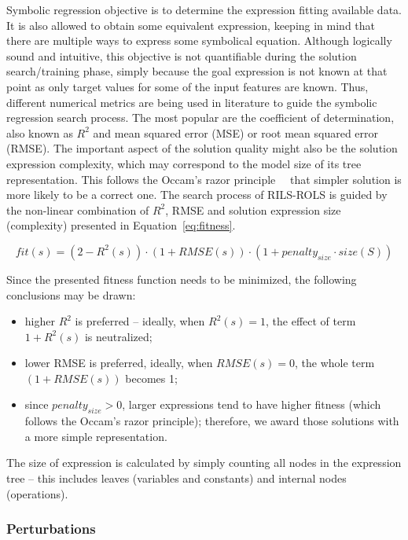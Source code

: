 \documentclass[a4paper,12pt]{elsarticle}
\begin{document}
Symbolic regression objective is to determine the expression fitting available data. It is also allowed to obtain some equivalent expression, keeping in mind that there are multiple ways to express some symbolical equation. Although logically sound and intuitive, this objective is not quantifiable during the solution search/training phase, simply because the goal expression is not known at that point as only target values for some of the input features are known. Thus, different numerical metrics are being used in literature to guide the symbolic regression search process. The most popular are the coefficient of determination, also known as $R^2$ and mean squared error (MSE) or root mean squared error (RMSE). The important aspect of the solution quality might also be the solution expression complexity, which may correspond to the model size of its tree representation. This follows the Occam's razor principle~\cite{costa2020fast}~ that simpler solution  is more likely to be a correct one. 
The search process of \textsc{RILS}-\textsc{ROLS}  is guided by the non-linear combination of $R^2$, RMSE and solution expression size (complexity) presented in Equation~\ref{eq:fitness}. 
 
\begin{equation}
	\label{eq:fitness}
	fit(s) = (2-R^2(s)) \cdot (1+RMSE(s)) \cdot (1+penalty_{size} \cdot size(S))
\end{equation}

Since the presented fitness function needs to be minimized, the following conclusions may be drawn:
\begin{itemize}
	\item higher $R^2$ is preferred -- ideally, when $R^2(s)=1$, the effect of term $1+R^2(s)$ is neutralized; %
	\item lower RMSE is preferred, ideally, when $RMSE(s)=0$, the whole term $(1+RMSE(s))$ becomes 1;
	\item since $penalty_{size} > 0$, larger expressions tend to have higher fitness (which follows the Occam's razor principle); therefore, we award those solutions with a more simple representation. 
\end{itemize}

The size of expression is calculated by simply counting all nodes in the expression tree -- this includes leaves (variables and constants) and internal nodes (operations). 

\subsubsection{Perturbations}\label{sec:pertGen}
\end{document}
